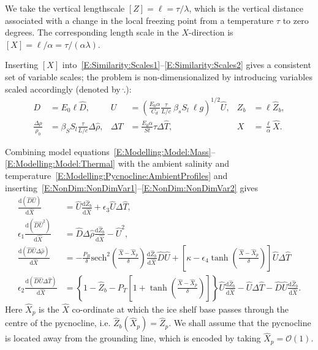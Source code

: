 \documentclass[openacc]{rsproca_new}%
\newcommand{\dd}[2]{\frac{\mathrm{d} #1}{\mathrm{d} #2}}
\newcommand{\order}[1]{\mathcal{O}(#1)}
\newcommand{\epsone}{\epsilon_{1}} %
\newcommand{\epstwo}{\epsilon_{2}} %
\newcommand{\epsthree}{\epsilon_{3}} %
\newcommand{\epsfour}{\epsilon_{4}}
\newcommand{\Pb}{\textit{P}_B}  %
\newcommand{\lt}{\delta} %
\newcommand{\Pt}{\textit{P}_T}
\begin{document}
We take the vertical lengthscale $\left[Z\right] = \ell= \tau / \lambda$, which is the vertical distance associated with a change in the local freezing point from a temperature $\tau$ to zero degrees. The corresponding length scale in the $X$-direction is $\left[X\right] = \ell / \alpha=\tau/ (\alpha \lambda)$.

Inserting $\left[X\right]$ into~\eqref{E:Similarity:Scales1}--\eqref{E:Similarity:Scales2} gives a consistent set of variable scales; the problem is non-dimensionalized by introducing variables scaled accordingly (denoted by  $\hat{.}$):
\begin{align}
D&= E_0 \ell \hat{D}, & U&= \left(\frac{E_0 \alpha}{C_d} \frac{\tau}{L/c}~\beta_s S_l ~\ell  g\right)^{1/2}\hat{U}, & Z_b &= \ell \hat{Z}_b,\label{E:NonDim:NonDimVar1}\\
\frac{\Delta \rho}{\rho_0} &= \beta_S S_l \frac{\tau}{L/c}\Delta \hat{\rho}, & \Delta T &= \frac{E_0 \alpha}{St}\tau \Delta \hat{T}, & X &=\frac{\ell}{\alpha}\hat{X}. \label{E:NonDim:NonDimVar2}
\end{align}

Combining model equations~\eqref{E:Modelling:Model:Mass}--\eqref{E:Modelling:Model:Thermal} with the ambient salinity and temperature~\eqref{E:Modelling:Pycnocline:AmbientProfiles} and inserting~\eqref{E:NonDim:NonDimVar1}--\eqref{E:NonDim:NonDimVar2} gives
\begin{align}
\dd{(\hat{D}\hat{U})}{\hat{X}} &= \hat{U} \dd{\hat{Z}_b}{\hat{X}} +\epsthree \hat{U} \Delta \hat{T},\label{E:NonDim:mass}\\
\epsone \dd{(\hat{D}\hat{U}^2)}{\hat{X}} &= \hat{D} \Delta \hat{\rho} \dd{\hat{Z}_b}{\hat{X}} - \hat{U}^2,\label{E:NonDim:mom} \\
\dd{(\hat{D}\hat{U}\Delta \hat{\rho})}{\hat{X}}  &= -\frac{\Pb}{\delta} \mathrm{sech}^2\left(\frac{\hat{X} - \hat{X}_p}{\lt}\right)\dd{\hat{Z}_b}{\hat{X}} \hat{D}\hat{U}+
 \left[\kappa - \epsfour \tanh \left(\frac{\hat{X} - \hat{X}_p}{\lt}\right) \right] \hat{U} \Delta \hat{T}\label{E:NonDim:buoyancy} \\
\epstwo \dd{(\hat{D}\hat{U}\Delta \hat{T})}{\hat{X}} &= \left\{1 - \hat{Z}_b - \Pt\left[1 + \tanh\left(\frac{\hat{X} - \hat{X}_p}{\lt}\right)\right]\right\} \hat{U}\dd{\hat{Z}_b}{\hat{X}}  - \hat{U}\Delta \hat{T}- \hat{D}\hat{U}\dd{\hat{Z}_b}{\hat{X}}.\label{E:NonDim:thermal}
 \end{align}Here $\hat{X}_p$ is the $\hat{X}$ co-ordinate at which the ice shelf base passes through the centre of the pycnocline, i.e. $\hat{Z}_b(\hat{X}_p) = \hat{Z}_p$. We shall assume that the pycnocline is located away from the grounding line, which is encoded by taking $\hat{X}_p = \order{1}$.
\end{document}
